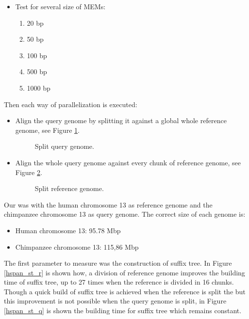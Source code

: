 \documentclass[10pt]{bmc_article}
\newenvironment{bmcformat}{\begin{raggedright}\baselineskip20pt\sloppy\setboolean{publ}{false}}{\end{raggedright}\baselineskip20pt\sloppy}
\begin{document}
\begin{bmcformat}
\begin{itemize}
\begin{itemize}
\end{itemize}
\item Test for several size of MEMs:
  \begin{enumerate}
    \item 20 bp
    \item 50 bp
    \item 100 bp
    \item 500 bp
    \item 1000 bp
  \end{enumerate} 
\end{itemize}
Then each way of parallelization is executed:
\begin{itemize}
\item Align the query genome by splitting it against a global whole reference genome, see Figure \ref{splitqry}.
\begin{figure}[htb] 
  \begin{center}
  \end{center}
 \caption{Split query genome.}
 \label{splitqry}
\end{figure}
\item Align the whole query genome against every chunk of reference genome, see Figure \ref{splitref}.
\begin{figure}[htb]
  \begin{center}
  \end{center}
 \caption{Split reference genome.}
 \label{splitref}
\end{figure}
\end{itemize}
Our was with the human chromosome 13 as reference genome and the chimpanzee chromosome 13 as query genome. The correct size of each genome is:
\begin{itemize}
  \item Human chromosome 13: 95.78 Mbp
  \item Chimpanzee chromosome 13: 115,86 Mbp
\end{itemize}
The first parameter to measure was the construction of suffix tree. In Figure \ref{hspan_st_r} is shown how, a division of reference genome improves the building time of suffix tree, up to 27 times when the reference is divided in 16 chunks. Though a quick build of suffix tree is achieved when the reference is split the but this improvement is not possible when the query genome is split, in Figure \ref{hspan_st_q} is shown the building time for suffix tree which remains constant.

\end{bmcformat}
\end{document}

